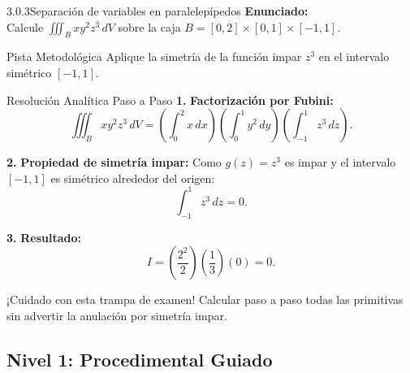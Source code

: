 \documentclass[11pt,a4paper]{article}
\begin{document}
\begin{nivelbox}{3.0.3}{Separación de variables en paralelepípedos}
\textbf{Enunciado:}\\
Calcule $\iiint_B x y^2 z^3 \, dV$ sobre la caja $B = [0, 2] \times [0, 1] \times [-1, 1]$.

\begin{observacionbox}{Pista Metodológica}
Aplique la simetría de la función impar $z^3$ en el intervalo simétrico $[-1, 1]$.
\end{observacionbox}

\begin{ejerciciobox}{Resolución Analítica Paso a Paso}
\smallskip\noindent\textbf{1.} \textbf{Factorización por Fubini:}
\[\iiint_B x y^2 z^3 \, dV = \left( \int_0^2 x \, dx \right) \left( \int_0^1 y^2 \, dy \right) \left( \int_{-1}^1 z^3 \, dz \right).\]

\smallskip\noindent\textbf{2.} \textbf{Propiedad de simetría impar:}
Como $g(z) = z^3$ es impar y el intervalo $[-1, 1]$ es simétrico alrededor del origen:
\[\int_{-1}^1 z^3 \, dz = 0.\]

\smallskip\noindent\textbf{3.} \textbf{Resultado:}
\[I = \left( \frac{2^2}{2} \right) \left( \frac{1}{3} \right) (0) = 0.\]
\end{ejerciciobox}

\begin{errorbox}{¡Cuidado con esta trampa de examen!}
Calcular paso a paso todas las primitivas sin advertir la anulación por simetría impar.
\end{errorbox}
\end{nivelbox}
\bigskip

\subsection{Nivel 1: Procedimental Guiado}
\end{document}
